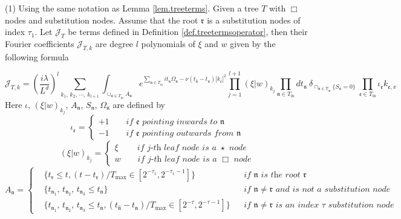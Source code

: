 \begin{lem}\label{lem.treetermsoperator} (1) Using the same notation as Lemma \ref{lem.treeterms}. Given a tree $T$ with $\Box$ nodes and substitution nodes. Assume that the root $\mathfrak{r}$ is a substitution nodes of index $\tau_{1}$. Let $\mathcal{J}_T$ be terms defined in Definition \ref{def.treetermsoperator}, then their Fourier coefficients $\mathcal{J}_{T,k}$ are degree $l$ polynomials of $\xi$ and $w$ given by the following formula

\begin{equation}\label{eq.coeftermoperator}
\mathcal{J}_{T,k}=\left(\frac{i\lambda}{L^{d}}\right)^l\sum_{k_1,\, k_2,\, \cdots,\, k_{l+1}} \int_{\cup_{\mathfrak{n}\in T_{\text{in}}} A_{\mathfrak{n}}} e^{\sum_{\mathfrak{n}\in T_{\text{in}}} it_{\mathfrak{n}}\Omega_{\mathfrak{n}}-\nu(t_{\widehat{\mathfrak{n}}}-t_{\mathfrak{n}})|k_{\mathfrak{e}}|^2} \prod_{j=1}^{l+1} (\xi|w)_{k_j} %
\prod_{\mathfrak{n}\in T_{\text{in}}} dt_{\mathfrak{n}} 
\ \delta_{\cap_{\mathfrak{n}\in T_{\text{in}}} \{S_{\mathfrak{n}}=0\}}\ \prod_{\mathfrak{e}\in T_{\text{in}}}\iota_{\mathfrak{e}}k_{\mathfrak{e},x}
\end{equation}
Here $\iota$, $(\xi|w)_{k_j}$, $A_{\mathfrak{n}}$, $S_{\mathfrak{n}}$, $\Omega_{\mathfrak{n}}$ are defined by 
\begin{equation}
    \iota_{\mathfrak{e}}=\begin{cases}
        +1 \qquad \textit{if $\mathfrak{e}$ pointing inwards to $\mathfrak{n}$}
        \\
        -1 \qquad  \textit{if $\mathfrak{e}$ pointing outwards from $\mathfrak{n}$}
    \end{cases}
\end{equation}
\begin{equation}
    (\xi|w)_{k_j}=\begin{cases}
        \xi \qquad\  \textit{if $j$-th leaf node is a $\star$ node}
        \\
        w \qquad  \textit{if $j$-th leaf node is a $\Box$ node}
    \end{cases}
\end{equation}
\begin{equation}
    A_{\mathfrak{n}}=\left\{
    \begin{aligned}
        &\{t_{\mathfrak{r}}\le t, (t-t_{\mathfrak{r}})/T_{\text{max}}\in [2^{-\tau_{1}},2^{-\tau_{1}-1}]\} && \textit{if $\mathfrak{n}$ is the root $\mathfrak{r}$ }
        \\
        &\{t_{\mathfrak{n}_1},\, t_{\mathfrak{n}_2},\, t_{\mathfrak{n}_3}\le t_{\mathfrak{n}}\} && \textit{if $\mathfrak{n}\ne \mathfrak{r}$ and is not a substitution node}
        \\
        &\{t_{\mathfrak{n}_1},\, t_{\mathfrak{n}_2},\, t_{\mathfrak{n}_3}\le t_{\mathfrak{n}}, (t_{\widehat{\mathfrak{n}}}-t_{\mathfrak{n}})/T_{\text{max}}\in [2^{-\tau},2^{-\tau-1}]\}  &&\textit{if $\mathfrak{n}\ne \mathfrak{r}$ is an index $\tau$ substitution node}
    \end{aligned}\right.
\end{equation}


\end{lem}
